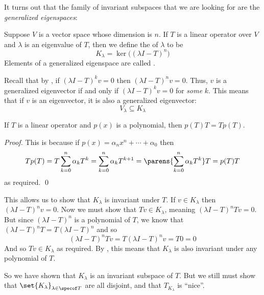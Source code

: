 It turns out that the family of invariant subspaces that we are looking for are the \emph{generalized eigenspaces}:

\begin{defn*}

    Suppose $V$ is a vector space whose dimension is $n$.
    If $T$ is a linear operator over $V$ and $\lambda$ is an eigenvalue of $T$, then we define the  of $\lambda$ to be
    \[ K_\lambda = \ker\bigl((\lambda I-T)^n\bigr) \]
    Elements of a generalized eigenspace are called .

\end{defn*}

Recall that by , if $(\lambda I-T)^kv=0$ then $(\lambda I-T)^nv=0$.
Thus, $v$ is a generalized eigenvector if and only if $(\lambda I-T)^kv=0$ for \emph{some} $k$.
This means that if $v$ is an eigenvector, it is also a generalized eigenvector:
\[ V_\lambda \subseteq K_\lambda \]

\begin{prop*}

    If $T$ is a linear operator and $p(x)$ is a polynomial, then $p(T)T=Tp(T)$.

\end{prop*}

\begin{proof}

    This is because if $p(x)=\alpha_nx^n+\cdots+\alpha_0$ then
    \[ Tp(T) = T\sum_{k=0}^n\alpha_kT^k = \sum_{k=0}^n\alpha_kT^{k+1} = \parens{\sum_{k=0}^n\alpha_kT^k}T = p(T)T \]
    as required.
    \qed

\end{proof}

This allows us to show that $K_\lambda$ is invariant under $T$.
If $v\in K_\lambda$ then $(\lambda I-T)^nv=0$.
Now we must show that $Tv\in K_\lambda$, meaning $(\lambda I-T)^nTv=0$.
But since $(\lambda I-T)^n$ is a polynomial of $T$, we know that $(\lambda I-T)^nT=T(\lambda I-T)^n$ and so
\[ (\lambda I-T)^nTv = T(\lambda I-T)^nv = T0 = 0 \]
And so $Tv\in K_\lambda$ as required.
By , this means that $K_\lambda$ is also invariant under any polynomial of $T$.

So we have shown that $K_\lambda$ is an invariant subspace of $T$.
But we still must show that $\set{K_\lambda}_{\lambda\in\specof T}$ are all disjoint, and that $T_{K_\lambda}$ is ``nice''.

